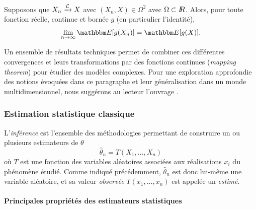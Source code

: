 \begin{theorem}
Supposons que $X_n \xrightarrow{{\cal{L}}} X$ avec $(X_n,X)\in\Omega^2$ avec $\Omega\subset I\!\!R$. Alors, pour toute fonction r\'eelle, continue et born\'ee $g$ (en particulier l'identit\'e),
$$
\lim\limits_{n\to\infty}\E[g(X_n)]  =  \E[g(X)]. \\
$$
\end{theorem}

\vspace{0.15cm}

Un ensemble de r\'esultats techniques permet de combiner ces diff\'erentes convergences et leurs transformations par des fonctions continues ({\it mapping theorem}) pour \'etudier des mod\`eles complexes. Pour une exploration approfondie des notions \'evoqu\'ees dans ce paragraphe et leur g\'en\'eralisation dans un monde multidimensionnel, nous sugg\'erons au lecteur l'ouvrage \cite{vandervaart1998}.

\subsubsection*{Estimation statistique classique}\label{estimation.stat.classique}

L'{\it inf\'erence} est l'ensemble des m\'ethodologies permettant de cons\-truire un ou plusieurs estimateurs  de $\theta$ 
$$
\hat{\theta}_n = T(X_1,\ldots,X_n)
$$
o\`u $T$ est une fonction des variables al\'eatoires associ\'ees aux r\'ealisations $x_i$ du ph\'enom\`ene \'etudi\'e. Comme indiqu\'e pr\'ec\'edemment, $\hat\theta_n
$ est donc lui-m\^eme une variable al\'eatoire, et sa valeur {\it observ\'ee} $T(x_1,\ldots,x_n)$ est appel\'ee un {\it estim\'e}. 

\paragraph{Principales propri\'et\'es des estimateurs statistiques}\label{proprietes.estimateur}


